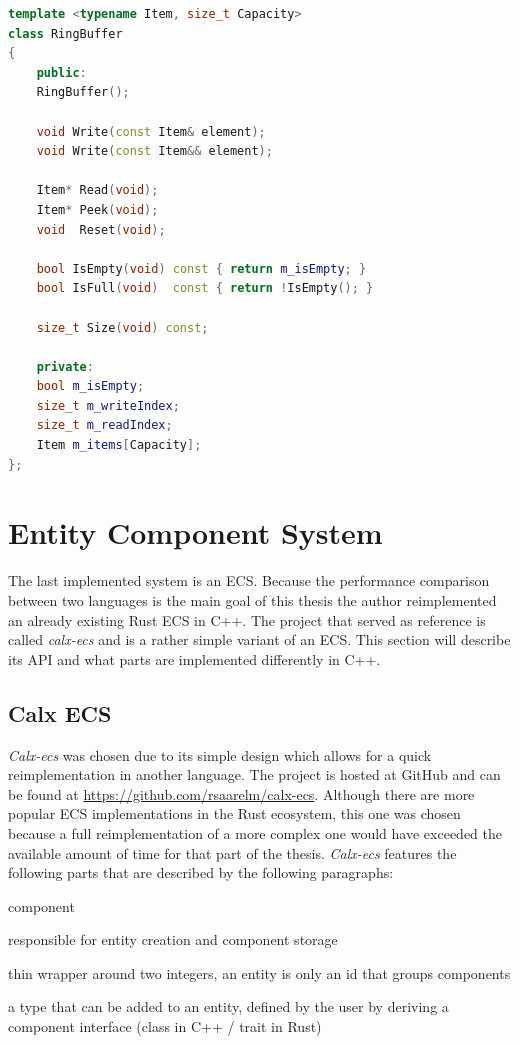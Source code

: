 \begin{lstlisting}[caption={Interface of the C++ Ringbuffer. Capacity is a non-type template parameter used to control the maximum element size.}, label={lst:cpp_ringbuffer_interface}, language={C++}]
template <typename Item, size_t Capacity>
class RingBuffer
{
	public:
	RingBuffer();
	
	void Write(const Item& element);
	void Write(const Item&& element);
	
	Item* Read(void);
	Item* Peek(void);
	void  Reset(void);
	
	bool IsEmpty(void) const { return m_isEmpty; }
	bool IsFull(void)  const { return !IsEmpty(); }
	
	size_t Size(void) const;
	
	private:
	bool m_isEmpty;
	size_t m_writeIndex;
	size_t m_readIndex;
	Item m_items[Capacity];
};
\end{lstlisting}

\section{Entity Component System} \label{ecs_impl}

The last implemented system is an \ac{ECS}. Because the performance comparison between two languages is the main goal of this thesis the author reimplemented an already existing Rust \ac{ECS} in C++. The project that served as reference is called \textit{calx-ecs} and is a rather simple variant of an \ac{ECS}. This section will describe its \ac{API} and what parts are implemented differently in C++.

\subsection{Calx ECS}

\textit{Calx-ecs} was chosen due to its simple design which allows for a quick reimplementation in another language. The project is hosted at GitHub and can be found at \url{https://github.com/rsaarelm/calx-ecs}. Although there are more popular \ac{ECS} implementations in the Rust ecosystem, this one was chosen because a full reimplementation of a more complex one would have exceeded the available amount of time for that part of the thesis. \textit{Calx-ecs} features the following parts that are described by the following paragraphs:

\begin{labeling}{component}
	\item [world] responsible for entity creation and component storage
	\item [entity] thin wrapper around two integers, an entity is only an id that groups components
	\item [component] a type that can be added to an entity, defined by the user by deriving a
	component interface (class in C++ / trait in Rust)
\end{labeling}

